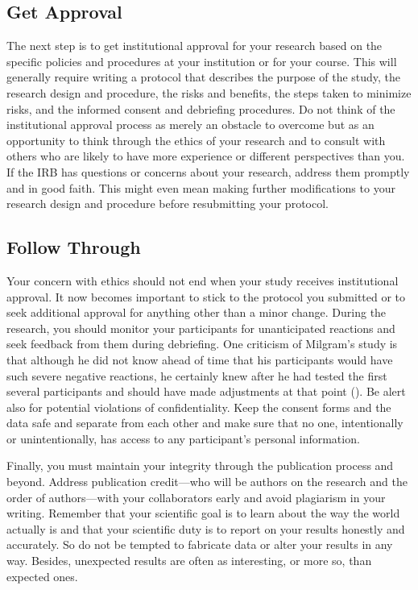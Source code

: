 \documentclass[
]{krantz}
\begin{document}
\subsection*{Get Approval}\label{get-approval}


The next step is to get institutional approval for your research based on the specific policies and procedures at your institution or for your course. This will generally require writing a protocol that describes the purpose of the study, the research design and procedure, the risks and benefits, the steps taken to minimize risks, and the informed consent and debriefing procedures. Do not think of the institutional approval process as merely an obstacle to overcome but as an opportunity to think through the ethics of your research and to consult with others who are likely to have more experience or different perspectives than you. If the IRB has questions or concerns about your research, address them promptly and in good faith. This might even mean making further modifications to your research design and procedure before resubmitting your protocol.

\subsection*{Follow Through}\label{follow-through}


Your concern with ethics should not end when your study receives institutional approval. It now becomes important to stick to the protocol you submitted or to seek additional approval for anything other than a minor change. During the research, you should monitor your participants for unanticipated reactions and seek feedback from them during debriefing. One criticism of Milgram's study is that although he did not know ahead of time that his participants would have such severe negative reactions, he certainly knew after he had tested the first several participants and should have made adjustments at that point (). Be alert also for potential violations of confidentiality. Keep the consent forms and the data safe and separate from each other and make sure that no one, intentionally or unintentionally, has access to any participant's personal information.

Finally, you must maintain your integrity through the publication process and beyond. Address publication credit---who will be authors on the research and the order of authors---with your collaborators early and avoid plagiarism in your writing. Remember that your scientific goal is to learn about the way the world actually is and that your scientific duty is to report on your results honestly and accurately. So do not be tempted to fabricate data or alter your results in any way. Besides, unexpected results are often as interesting, or more so, than expected ones.
\end{document}
